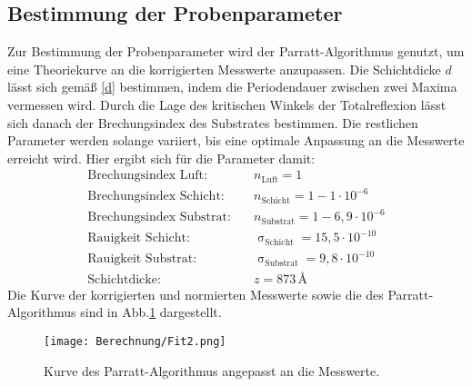 \subsection{Bestimmung der Probenparameter}
Zur Bestimmung der Probenparameter wird der Parratt-Algorithmus genutzt, um eine Theoriekurve an die  korrigierten Messwerte anzupassen. Die Schichtdicke $d$ lässt sich gemäß \eqref{d} bestimmen, indem die Periodendauer zwischen zwei Maxima vermessen wird. Durch die Lage des kritischen Winkels der Totalreflexion lässt sich danach der Brechungsindex des Substrates bestimmen. Die restlichen Parameter werden solange variiert, bis eine optimale Anpassung an die Messwerte erreicht wird. Hier ergibt sich für die Parameter damit:
\begin{align}
  \text{Brechungsindex Luft}:&\quad n_\text{Luft}=1 \nonumber\\
  \text{Brechungsindex Schicht}:&\quad n_\text{Schicht}= 1-1\cdot10^{-6} \nonumber\\
  \text{Brechungsindex Substrat}:&\quad n_\text{Substrat}=1-6,9\cdot10^{-6} \nonumber\\
  \text{Rauigkeit Schicht}:&\quad \upsigma_\text{Schicht}=15,5\cdot10^{-10} \nonumber\\
  \text{Rauigkeit Substrat}:&\quad \upsigma_\text{Substrat}=9,8\cdot10^{-10} \nonumber\\
  \text{Schichtdicke}:&\quad z=873\,\si{\angstrom}\nonumber
\end{align}
Die Kurve der korrigierten und normierten Messwerte sowie die des Parratt-Algorithmus sind in Abb.\ref{fit} dargestellt.
\begin{figure}[H]
  \centering
  \texttt{[image: Berechnung/Fit2.png]}
  \caption{Kurve des Parratt-Algorithmus angepasst an die Messwerte.}
  \label{fit}
\end{figure}
